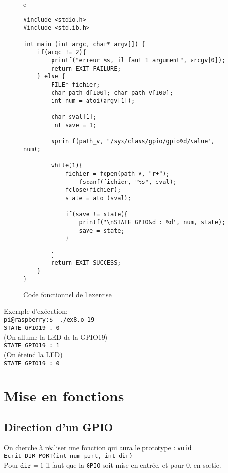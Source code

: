 \documentclass[11pt, openright]{book}
\begin{document}
\begin{figure}[ht!]
	\centering
	\begin{tabular}{c}
		\begin{lstlisting}
#include <stdio.h>
#include <stdlib.h>

int main (int argc, char* argv[]) {
    if(argc != 2){
        printf("erreur %s, il faut 1 argument", arcgv[0]);
        return EXIT_FAILURE;
    } else {
        FILE* fichier;
        char path_d[100]; char path_v[100];
		int num = atoi(argv[1]);

        char sval[1];
		int save = 1;

        sprintf(path_v, "/sys/class/gpio/gpio%d/value", num);

        while(1){
            fichier = fopen(path_v, "r+");
                fscanf(fichier, "%s", sval);
            fclose(fichier);
            state = atoi(sval);

            if(save != state){
				printf("\nSTATE GPIO&d : %d", num, state);
                save = state;
            }
        
        }
        return EXIT_SUCCESS;
    }
}		
				\end{lstlisting}
	\end{tabular}
	\caption{Code fonctionnel de l'exercise }
\end{figure}

Exemple d'exécution:\\
\texttt{pi@raspberry:\text{$\sim$}\$ \ ./ex8.o 19}\\
\texttt{STATE GPIO19 : 0}\\
(On allume la LED de la GPIO19)\\
\texttt{STATE GPIO19 : 1}\\
(On éteind la LED)\\
\texttt{STATE GPIO19 : 0}


\newpage
\section{Mise en fonctions}

\subsection{Direction d'un GPIO}

On cherche à réaliser une fonction qui aura le prototype : \texttt{void Ecrit\_DIR\_PORT(int num\_port, int dir)}\\
Pour $\texttt{dir}=1$ il faut que la \texttt{GPIO} soit mise en entrée, et pour $0$, en sortie.
\end{document}
